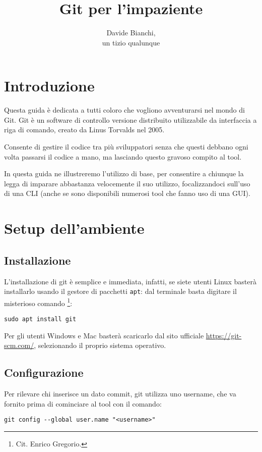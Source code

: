 \documentclass[a4paper, 11pt]{article}
\title{\huge{Git per l'impaziente}}
\author{Davide Bianchi, \\ un tizio qualunque}
\begin{document}
	\maketitle
	
	\newpage
	\tableofcontents
	\newpage
	
	\section{Introduzione}
	Questa guida è dedicata a tutti coloro che vogliono avventurarsi nel mondo di Git. Git è un software di controllo versione distribuito utilizzabile da interfaccia a riga di comando, creato da Linus Torvalds nel 2005.
	
	Consente di gestire il codice tra più sviluppatori senza che questi debbano ogni volta passarsi il codice a mano, ma lasciando questo gravoso compito al tool.
	
	In questa guida ne illustreremo l'utilizzo di base, per consentire a chiunque la legga di imparare abbastanza velocemente il suo utilizzo, focalizzandoci sull'uso di una CLI (anche se sono disponibili numerosi tool che fanno uso di una GUI).
	
	\section{Setup dell'ambiente}
	\subsection{Installazione}
	L'installazione di git è semplice e immediata, infatti, se siete utenti Linux basterà installarlo usando il gestore di pacchetti \lstinline|apt|: dal terminale basta digitare il misterioso comando \footnote{Cit. Enrico Gregorio.}: \begin{lstlisting}
sudo apt install git
	\end{lstlisting}
	Per gli utenti Windows e Mac basterà scaricarlo dal sito ufficiale \url{https://git-scm.com/}, selezionando il proprio sistema operativo.
	
	
	\subsection{Configurazione}
	Per rilevare chi inserisce un dato commit, git utilizza uno username, che va fornito prima di cominciare al tool con il comando:
	\begin{lstlisting}
git config --global user.name "<username>"
	\end{lstlisting}
	
\end{document}
